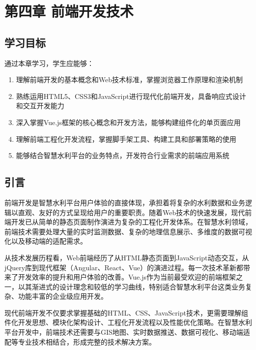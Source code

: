 \section{第四章 前端开发技术}\label{ux7b2cux56dbux7ae0-ux524dux7aefux5f00ux53d1ux6280ux672f}

\subsection{学习目标}\label{ux5b66ux4e60ux76eeux6807}

通过本章学习，学生应能够：

\begin{enumerate}
\def\labelenumi{\arabic{enumi}.}
\tightlist
\item
  理解前端开发的基本概念和Web技术标准，掌握浏览器工作原理和渲染机制
\item
  熟练运用HTML5、CSS3和JavaScript进行现代化前端开发，具备响应式设计和交互开发能力
\item
  深入掌握Vue.js框架的核心概念和开发方法，能够构建组件化的单页面应用
\item
  理解前端工程化开发流程，掌握脚手架工具、构建工具和部署策略的使用
\item
  能够结合智慧水利平台的业务特点，开发符合行业需求的前端应用系统
\end{enumerate}

\subsection{引言}\label{ux5f15ux8a00}

前端开发是智慧水利平台用户体验的直接体现，承担着将复杂的水利数据和业务逻辑以直观、友好的方式呈现给用户的重要职责。随着Web技术的快速发展，现代前端开发已从简单的静态页面制作演进为复杂的工程化开发体系。在智慧水利领域，前端技术需要处理大量的实时监测数据、复杂的地理信息展示、多维度的数据可视化以及移动端的适配需求。

从技术发展历程看，Web前端经历了从HTML静态页面到JavaScript动态交互，从jQuery库到现代框架（Angular、React、Vue）的演进过程。每一次技术革新都带来了开发效率的提升和用户体验的改善。Vue.js作为当前最受欢迎的前端框架之一，以其渐进式的设计理念和较低的学习曲线，特别适合智慧水利平台这类业务复杂、功能丰富的企业级应用开发。

现代前端开发不仅要求掌握基础的HTML、CSS、JavaScript技术，更需要理解组件化开发思想、模块化架构设计、工程化开发流程以及性能优化策略。在智慧水利平台开发中，前端技术还需要与GIS地图、实时数据推送、数据可视化、移动端适配等专业技术相结合，形成完整的技术解决方案。

